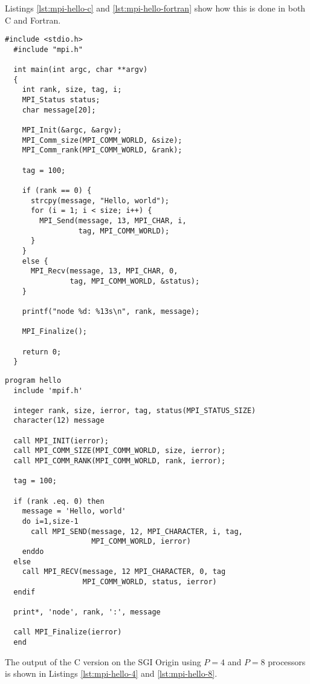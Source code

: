 Listings \ref{lst:mpi-hello-c} and \ref{lst:mpi-hello-fortran} show how this is
done in both C and Fortran.

\begin{lstlisting}[style=c, float, caption={Hello world MPI in C.}, label=lst:mpi-hello-c]
  #include <stdio.h>
  #include "mpi.h"

  int main(int argc, char **argv)
  {
    int rank, size, tag, i;
    MPI_Status status;
    char message[20];

    MPI_Init(&argc, &argv);
    MPI_Comm_size(MPI_COMM_WORLD, &size);
    MPI_Comm_rank(MPI_COMM_WORLD, &rank);

    tag = 100;

    if (rank == 0) {
      strcpy(message, "Hello, world");
      for (i = 1; i < size; i++) {
        MPI_Send(message, 13, MPI_CHAR, i,
                 tag, MPI_COMM_WORLD);
      }
    }
    else {
      MPI_Recv(message, 13, MPI_CHAR, 0,
               tag, MPI_COMM_WORLD, &status);
    }

    printf("node %d: %13s\n", rank, message);

    MPI_Finalize();

    return 0;
  }
\end{lstlisting}

\begin{lstlisting}[style=fortran, float, caption={Hello world MPI in Fortran.}, label=lst:mpi-hello-fortran]
  program hello
  include 'mpif.h'

  integer rank, size, ierror, tag, status(MPI_STATUS_SIZE)
  character(12) message

  call MPI_INIT(ierror);
  call MPI_COMM_SIZE(MPI_COMM_WORLD, size, ierror);
  call MPI_COMM_RANK(MPI_COMM_WORLD, rank, ierror);

  tag = 100;

  if (rank .eq. 0) then
    message = 'Hello, world'
    do i=1,size-1
      call MPI_SEND(message, 12, MPI_CHARACTER, i, tag,
                    MPI_COMM_WORLD, ierror)
    enddo
  else
    call MPI_RECV(message, 12 MPI_CHARACTER, 0, tag
                  MPI_COMM_WORLD, status, ierror)
  endif

  print*, 'node', rank, ':', message

  call MPI_Finalize(ierror)
  end
\end{lstlisting}

The output of the C version on the SGI Origin using $P=4$ and $P=8$ processors
is shown in Listings \ref{lst:mpi-hello-4} and \ref{lst:mpi-hello-8}.

